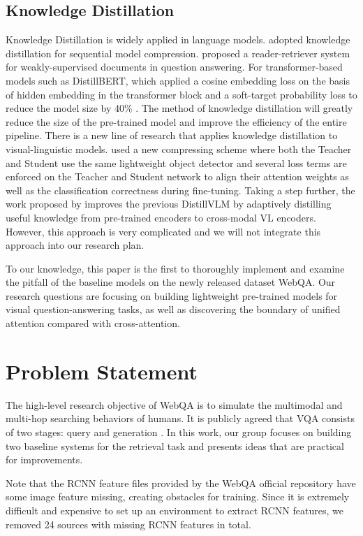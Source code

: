 \documentclass[nohyperref]{article}
\theoremstyle{plain}
\theoremstyle{definition}
\theoremstyle{remark}
\begin{document}
\subsection{Knowledge Distillation}
Knowledge Distillation is widely applied in language models. \citet{kd-seq} adopted knowledge distillation for sequential model compression. \cite{distill-text} proposed a reader-retriever system for weakly-supervised documents in question answering. For transformer-based models such as DistillBERT, which applied a cosine embedding loss on the basis of hidden embedding in the transformer block and a soft-target probability loss to reduce the model size by 40\% \citep{distillbert}. The method of knowledge distillation will greatly reduce the size of the pre-trained model and improve the efficiency of the entire pipeline. There is a new line of research that applies knowledge distillation to visual-linguistic models. \citet{distill-vl} used a new compressing scheme where both the Teacher and Student use the same lightweight object detector and several loss terms are enforced on the Teacher and Student network to align their attention weights as well as the classification correctness during fine-tuning. Taking a step further, the work proposed by \citet{adapt-distill} improves the previous DistillVLM by adaptively distilling useful knowledge from pre-trained encoders to cross-modal VL encoders. However, this approach is very complicated and we will not integrate this approach into our research plan.

To our knowledge, this paper is the first to thoroughly implement and examine the pitfall of the baseline models on the newly released dataset WebQA. Our research questions are focusing on building lightweight pre-trained models for visual question-answering tasks, as well as discovering the boundary of unified attention compared with cross-attention. 

\section{Problem Statement}
The high-level research objective of WebQA is to simulate the multimodal and multi-hop searching behaviors of humans. It is publicly agreed that VQA consists of two stages: query and generation \cite{webqa}. In this work, our group focuses on building two baseline systems for the retrieval task and presents ideas that are practical for improvements.

Note that the RCNN feature files provided by the WebQA official repository have some image feature missing, creating obstacles for training. Since it is extremely difficult and expensive to set up an environment to extract RCNN features, we removed 24 sources with missing RCNN features in total.
\end{document}
